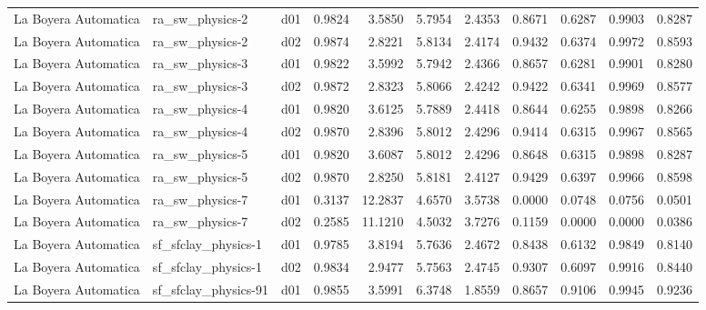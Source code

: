 \begin{longtable}{lllrrrrrrrr}
 La Boyera Automatica  &       ra\_sw\_physics-2 &     d01 &   0.9824 &   3.5850 &   5.7954 &       2.4353 &        0.8671 &       0.6287 &           0.9903 &  0.8287 \\
 La Boyera Automatica  &       ra\_sw\_physics-2 &     d02 &   0.9874 &   2.8221 &   5.8134 &       2.4174 &        0.9432 &       0.6374 &           0.9972 &  0.8593 \\
 La Boyera Automatica  &       ra\_sw\_physics-3 &     d01 &   0.9822 &   3.5992 &   5.7942 &       2.4366 &        0.8657 &       0.6281 &           0.9901 &  0.8280 \\
 La Boyera Automatica  &       ra\_sw\_physics-3 &     d02 &   0.9872 &   2.8323 &   5.8066 &       2.4242 &        0.9422 &       0.6341 &           0.9969 &  0.8577 \\
 La Boyera Automatica  &       ra\_sw\_physics-4 &     d01 &   0.9820 &   3.6125 &   5.7889 &       2.4418 &        0.8644 &       0.6255 &           0.9898 &  0.8266 \\
 La Boyera Automatica  &       ra\_sw\_physics-4 &     d02 &   0.9870 &   2.8396 &   5.8012 &       2.4296 &        0.9414 &       0.6315 &           0.9967 &  0.8565 \\
 La Boyera Automatica  &       ra\_sw\_physics-5 &     d01 &   0.9820 &   3.6087 &   5.8012 &       2.4296 &        0.8648 &       0.6315 &           0.9898 &  0.8287 \\
 La Boyera Automatica  &       ra\_sw\_physics-5 &     d02 &   0.9870 &   2.8250 &   5.8181 &       2.4127 &        0.9429 &       0.6397 &           0.9966 &  0.8598 \\
 La Boyera Automatica  &       ra\_sw\_physics-7 &     d01 &   0.3137 &  12.2837 &   4.6570 &       3.5738 &        0.0000 &       0.0748 &           0.0756 &  0.0501 \\
 La Boyera Automatica  &       ra\_sw\_physics-7 &     d02 &   0.2585 &  11.1210 &   4.5032 &       3.7276 &        0.1159 &       0.0000 &           0.0000 &  0.0386 \\
 La Boyera Automatica  &   sf\_sfclay\_physics-1 &     d01 &   0.9785 &   3.8194 &   5.7636 &       2.4672 &        0.8438 &       0.6132 &           0.9849 &  0.8140 \\
 La Boyera Automatica  &   sf\_sfclay\_physics-1 &     d02 &   0.9834 &   2.9477 &   5.7563 &       2.4745 &        0.9307 &       0.6097 &           0.9916 &  0.8440 \\
 La Boyera Automatica  &  sf\_sfclay\_physics-91 &     d01 &   0.9855 &   3.5991 &   6.3748 &       1.8559 &        0.8657 &       0.9106 &           0.9945 &  0.9236 \\

\end{longtable}
